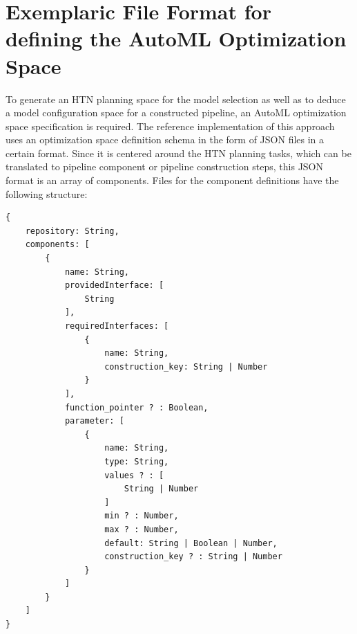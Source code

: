 \section{Exemplaric File Format for defining the AutoML Optimization Space}
\label{sec:implementation:json}
To generate an HTN planning space for the model selection as well as to deduce a model configuration space for a constructed pipeline, an AutoML optimization space specification is required.
The reference implementation of this approach uses an optimization space definition schema in the form of JSON files in a certain format.\newline
Since it is centered around the HTN planning tasks, which can be translated to pipeline component or pipeline construction steps, this JSON format is an array of components.
Files for the component definitions have the following structure:
\begin{verbatim}
{
    repository: String,
    components: [
        {
            name: String,
            providedInterface: [
                String
            ],
            requiredInterfaces: [
                {
                    name: String,
                    construction_key: String | Number
                }
            ],
            function_pointer ? : Boolean,
            parameter: [
                {
                    name: String,
                    type: String,
                    values ? : [
                        String | Number
                    ]
                    min ? : Number,
                    max ? : Number,
                    default: String | Boolean | Number,
                    construction_key ? : String | Number
                }
            ]
        }
    ]
}
\end{verbatim}

